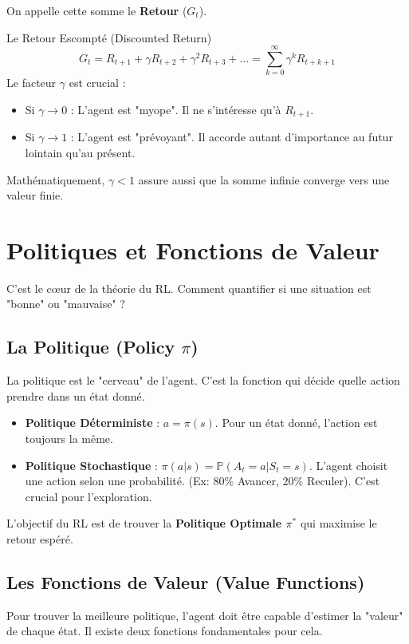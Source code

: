 \documentclass[a4paper,12pt]{report}
\begin{document}
On appelle cette somme le \textbf{Retour} ($G_t$).

\begin{mathdef}{Le Retour Escompté (Discounted Return)}
\[ G_t = R_{t+1} + \gamma R_{t+2} + \gamma^2 R_{t+3} + \dots = \sum_{k=0}^{\infty} \gamma^k R_{t+k+1} \]
Le facteur $\gamma$ est crucial :
\begin{itemize}
    \item Si $\gamma \to 0$ : L'agent est "myope". Il ne s'intéresse qu'à $R_{t+1}$.
    \item Si $\gamma \to 1$ : L'agent est "prévoyant". Il accorde autant d'importance au futur lointain qu'au présent.
\end{itemize}
Mathématiquement, $\gamma < 1$ assure aussi que la somme infinie converge vers une valeur finie.
\end{mathdef}

\chapter{Politiques et Fonctions de Valeur}

C'est le cœur de la théorie du RL. Comment quantifier si une situation est "bonne" ou "mauvaise" ?

\section{La Politique (Policy $\pi$)}
La politique est le "cerveau" de l'agent. C'est la fonction qui décide quelle action prendre dans un état donné.

\begin{itemize}
    \item \textbf{Politique Déterministe} : $a = \pi(s)$. Pour un état donné, l'action est toujours la même.
    \item \textbf{Politique Stochastique} : $\pi(a|s) = \mathbb{P}(A_t=a | S_t=s)$. L'agent choisit une action selon une probabilité. (Ex: 80\% Avancer, 20\% Reculer). C'est crucial pour l'exploration.
\end{itemize}

L'objectif du RL est de trouver la \textbf{Politique Optimale $\pi^*$} qui maximise le retour espéré.

\section{Les Fonctions de Valeur (Value Functions)}
Pour trouver la meilleure politique, l'agent doit être capable d'estimer la "valeur" de chaque état. Il existe deux fonctions fondamentales pour cela.
\end{document}
